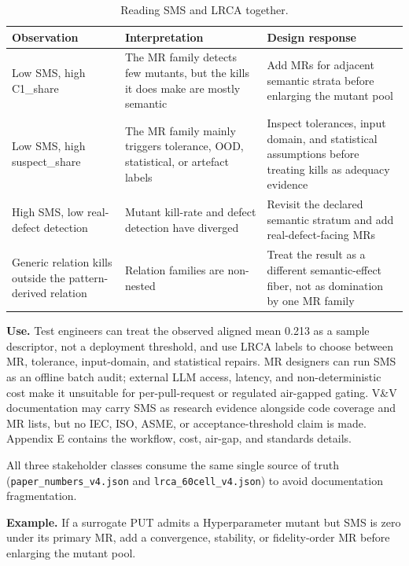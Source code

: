 \documentclass[review,12pt,authoryear]{elsarticle}
\begin{document}
{\def\LTcaptype{table} %
\begin{longtable}[]{@{}
  >{\raggedright\arraybackslash}p{}
  >{\raggedright\arraybackslash}p{}
  >{\raggedright\arraybackslash}p{}@{}}
\caption{Reading SMS and LRCA together.}\label{tab:sms-lrca-reading}\\
\toprule\noalign{}
Observation & Interpretation & Design response \\
\midrule\noalign{}
\endfirsthead
\endhead
\bottomrule\noalign{}
\endlastfoot
Low SMS, high C1\_share & The MR family detects few mutants, but the
kills it does make are mostly semantic & Add MRs for adjacent semantic
strata before enlarging the mutant pool \\
Low SMS, high suspect\_share & The MR family mainly triggers tolerance,
OOD, statistical, or artefact labels & Inspect tolerances, input domain,
and statistical assumptions before treating kills as adequacy evidence \\
High SMS, low real-defect detection & Mutant kill-rate and defect
detection have diverged & Revisit the declared semantic stratum and add
real-defect-facing MRs \\
Generic relation kills outside the pattern-derived relation & Relation
families are non-nested & Treat the result as a different
semantic-effect fiber, not as domination by one MR family \\
\end{longtable}
}

\textbf{Use.} Test engineers can treat the observed aligned mean 0.213
as a sample descriptor, not a deployment threshold, and use LRCA labels
to choose between MR, tolerance, input-domain, and statistical repairs.
MR designers can run SMS as an offline batch audit; external LLM access,
latency, and non-deterministic cost make it unsuitable for
per-pull-request or regulated air-gapped gating. V\&V documentation may
carry SMS as research evidence alongside code coverage and MR lists,
but no IEC, ISO, ASME, or acceptance-threshold claim is made. Appendix E
contains the workflow, cost, air-gap, and standards details.

All three stakeholder classes consume the same single source of truth
(\texttt{paper\_numbers\_v4.json} and \texttt{lrca\_60cell\_v4.json}) to
avoid documentation fragmentation.

\textbf{Example.} If a surrogate PUT admits a Hyperparameter mutant but
SMS is zero under its primary MR, add a convergence, stability, or
fidelity-order MR before enlarging the mutant pool.
\end{document}
